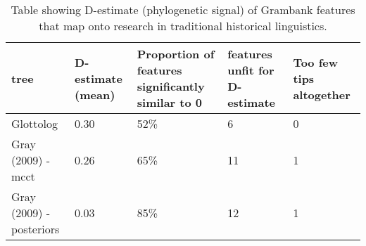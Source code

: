 \begin{table}[ht]
\centering
\begin{tabular}{p{4.5cm}p{2.2cm}p{2.2cm}p{2.2cm}p{2.2cm}}
  \hline
tree & D-estimate (mean) & Proportion of features significantly similar to 0 & features unfit for D-estimate & Too few tips altogether \\ 
  \hline
Glottolog & 0.30 & 52\% & 6 & 0 \\ 
  Gray (2009) - mcct & 0.26 & 65\% & 11 & 1 \\ 
  Gray (2009) - posteriors & 0.03 & 85\% & 12 & 1 \\ 
   \hline
\end{tabular}
\caption{Table showing D-estimate (phylogenetic signal) of Grambank features that map onto research in traditional historical linguistics.} 
\label{d_estimate_summary}
\end{table}

